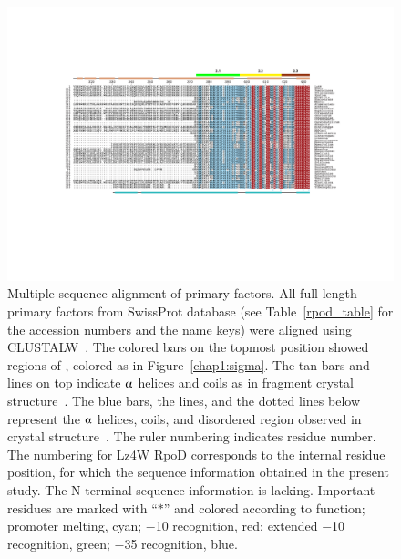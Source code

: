\begin{figure}
\centering
\includegraphics{figures/chap4_rpod_align_1}
\caption[Multiple sequence alignment of primary \s{}
factors]{Multiple sequence alignment of primary \s{} factors. All
full-length primary \s{} factors from SwissProt database (see
Table~\ref{rpod_table} for the accession numbers and the name
keys) were aligned using CLUSTALW~\citep{Higgins1996}. The colored
bars on the topmost position showed regions of \s{}, colored as in
Figure~\ref{chap1:sigma}. The tan bars and lines on top indicate
$\alphaup$ helices and coils as in  \s{}
fragment crystal structure~\citep[][PDB coordinate
1SIG]{Malhotra1996}. The blue bars, the lines, and the dotted
lines below represent the $\alphaup$ helices, coils, and
disordered region observed in  \s{}
crystal structure~\citep[][PDB coordinate 1IW7]{Vassy2002}. The
ruler numbering indicates  residue number. The numbering
for Lz4W RpoD corresponds to the internal residue position, for
which the sequence information obtained in the present study. The
N-terminal sequence information is lacking. Important residues are
marked with ``$\ast$'' and colored according to function; promoter
melting, cyan; $-$10 recognition, red; extended $-$10 recognition,
green; $-$35 recognition, blue.} \label{rpod_align}
\end{figure}
